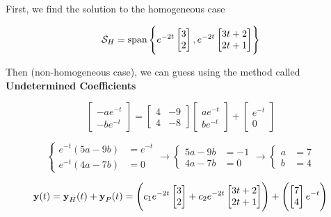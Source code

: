 	\begin{sol}
		First, we find the solution to the homogeneous case

		\[\mathcal{S}_H = \mathrm{span}\left\{
			e^{-2t} \begin{bmatrix}
				3\\2
			\end{bmatrix}, e^{-2t} \begin{bmatrix}
				3t+2\\2t+1
			\end{bmatrix}
		\right\}\]

		Then (non-homogeneous case), we can guess using the method called \textbf{Undetermined Coefficients}

		\begin{equation}
			\begin{bmatrix}
				-ae^{-t}\\-be^{-t}
			\end{bmatrix} = \begin{bmatrix}
				4&-9\\4&-8
			\end{bmatrix} \begin{bmatrix}
				ae^{-t}\\be^{-t}
			\end{bmatrix} + \begin{bmatrix}
				e^{-t}\\0
			\end{bmatrix}
		\end{equation}

		\begin{equation}
			\begin{cases}
				e^{-t}(5a - 9b) &= e^{-t}\\
				e^{-t}(4a - 7b) &= 0
			\end{cases} \longrightarrow \begin{cases}
				5a - 9b &= -1\\
				4a - 7b &= 0
			\end{cases} \longrightarrow \begin{cases}
				a &= 7\\
				b &= 4
			\end{cases}
		\end{equation}

		\begin{equation}
			\bm{\mathrm{y}}(t) = \bm{\mathrm{y}}_H(t) + \bm{\mathrm{y}}_P(t) = \left(c_1 e^{-2t} \begin{bmatrix}
				3\\2
			\end{bmatrix} + c_2 e^{-2t} \begin{bmatrix}
				3t+2\\2t+1
			\end{bmatrix} \right) + \left(\begin{bmatrix}
				7\\4
			\end{bmatrix} e^{-t}\right)
		\end{equation}
	\end{sol}
	
